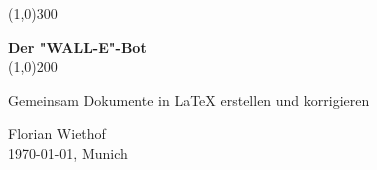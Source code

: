 \begin{titlepage}
	\vspace*{\fill}
	\begin{center}
		\color{gray}\line(1,0){300} \\
		\color{black}
		\vspace{1cm}

		\huge{\bfseries Der "WALL-E"-Bot} \\
		[0.15in]
		\color{gray}\line(1,0){200} \\
		\color{black}

		\vspace{0.5cm}
		\begin{minipage}{8cm}
			\begin{center}
				\large{Gemeinsam Dokumente in LaTeX erstellen und korrigieren}
			\end{center}
		\end{minipage}	
	\end{center}
	\vspace*{\fill}
	\vspace{5cm}
	
	\begin{flushright}
		Florian Wiethof \\
		\today, Munich
	\end{flushright}
\end{titlepage}



\tableofcontents
{}
\thispagestyle{empty}
\clearpage
\setcounter{page}{1}

